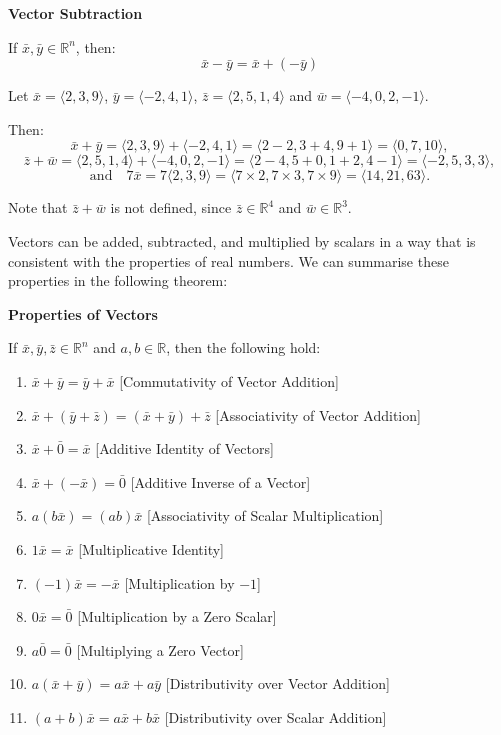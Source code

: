 \begin{definitionbox}
\textbf{Vector Subtraction}

If $\bar{x}, \bar{y} \in \mathbb{R}^n$, then:
\[
\bar{x} - \bar{y} = \bar{x} + (-\bar{y})
\]
\end{definitionbox}

\begin{examplebox}
  Let $\bar{x} = \langle 2, 3, 9 \rangle$, $\bar{y} = \langle -2, 4, 1 \rangle$, $\bar{z} = \langle 2, 5, 1, 4 \rangle$ and $\bar{w} = \langle -4, 0, 2, -1 \rangle$.

\noindent Then:
\[
\bar{x} + \bar{y} = \langle 2, 3, 9 \rangle + \langle -2, 4, 1 \rangle 
= \langle 2 - 2, 3 + 4, 9 + 1 \rangle 
= \langle 0, 7, 10 \rangle,
\]
\[
\bar{z} + \bar{w} = \langle 2, 5, 1, 4 \rangle + \langle -4, 0, 2, -1 \rangle 
= \langle 2 - 4, 5 + 0, 1 + 2, 4 - 1 \rangle 
= \langle -2, 5, 3, 3 \rangle,
\]
\[
\text{and} \quad 7\bar{x} = 7 \langle 2, 3, 9 \rangle 
= \langle 7 \times 2, 7 \times 3, 7 \times 9 \rangle 
= \langle 14, 21, 63 \rangle.
\]

\noindent Note that $\bar{z} + \bar{w}$ is not defined, since $\bar{z} \in \mathbb{R}^4$ and $\bar{w} \in \mathbb{R}^3$.
\end{examplebox}

Vectors can be added, subtracted, and multiplied by scalars in a way that is 
consistent with the properties of real numbers.
We can summarise these properties in the following theorem:
\begin{theorembox}
\textbf{Properties of Vectors}

If $\bar{x}, \bar{y}, \bar{z} \in \mathbb{R}^n$ and $a, b \in \mathbb{R}$, then the following hold:
\begin{enumerate}
\item $\bar{x} + \bar{y} = \bar{y} + \bar{x}$ \hfill [Commutativity of Vector Addition]
\item $\bar{x} + (\bar{y} + \bar{z}) = (\bar{x} + \bar{y}) + \bar{z}$ \hfill [Associativity of Vector Addition]
\item $\bar{x} + \bar{0} = \bar{x}$ \hfill [Additive Identity of Vectors]
\item $\bar{x} + (-\bar{x}) = \bar{0}$ \hfill [Additive Inverse of a Vector]
\item $a(b\bar{x}) = (ab)\bar{x}$ \hfill [Associativity of Scalar Multiplication]
\item $1\bar{x} = \bar{x}$ \hfill [Multiplicative Identity]
\item $(-1)\bar{x} = -\bar{x}$ \hfill [Multiplication by $-1$]
\item $0\bar{x} = \bar{0}$ \hfill [Multiplication by a Zero Scalar]
\item $a\bar{0} = \bar{0}$ \hfill [Multiplying a Zero Vector]
\item $a(\bar{x} + \bar{y}) = a\bar{x} + a\bar{y}$ \hfill [Distributivity over Vector Addition]
\item $(a + b)\bar{x} = a\bar{x} + b\bar{x}$ \hfill [Distributivity over Scalar Addition]
\end{enumerate}
\end{theorembox}

